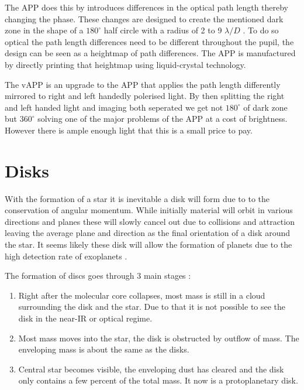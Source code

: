 The \ac{APP} does this by introduces differences in the optical path length thereby changing the phase. These changes are designed to create the mentioned dark zone in the shape of a $180^\circ$ half circle with a radius of 2 to 9 $\lambda/D$ \cite{vAPP_vs_APP}. To do so optical the path length differences need to be different throughout the pupil, the design can be seen as a heightmap of path differences. The \ac{APP} is manufactured by directly printing that heightmap using liquid-crystal technology. 

The \ac{vAPP} is an upgrade to the \ac{APP} that applies the path length differently mirrored to right and left handedly polerised light. By then splitting the right and left handed light and imaging both seperated we get not $180^\circ$ of dark zone but $360^\circ$ solving one of the major problems of the \ac{APP} at a cost of brightness. However there is ample enough light that this is a small price to pay.






\section{Disks} %
\label{sec:disks} %

With the formation of a star it is inevitable a disk will form due to to the conservation of angular momentum. While initially material will orbit in various directions and planes these will slowly cancel out due to collisions and attraction leaving the average plane and direction as the final orientation of a disk around the star. It seems likely these disk will allow the formation of planets due to the high detection rate of exoplanets \cite{williams}.

The formation of discs goes through 3 main stages\cite{williams} :

\begin{enumerate}
  \item Right after the molecular core collapses, most mass is still in a cloud surrounding the disk and the star. Due to that it is not possible to see the disk in the near-IR  or optical regime.
  \item Most mass moves into the star, the disk is obstructed by outflow of mass. The enveloping mass is about the same as the disks.
  \item Central star becomes visible, the enveloping dust has cleared and the disk only contains a few percent of the total mass. It now is a protoplanetary disk.
\end{enumerate}

